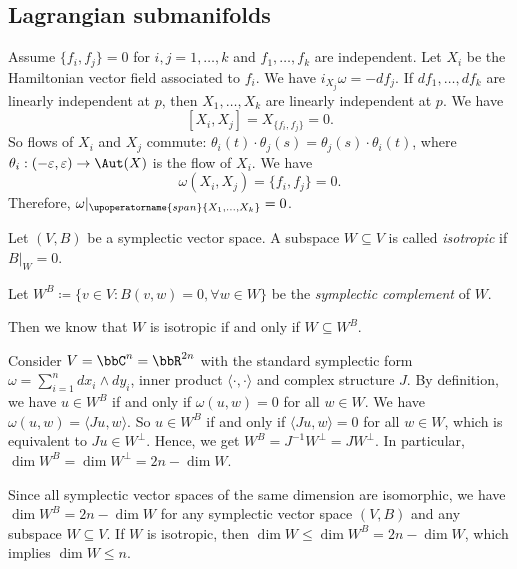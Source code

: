 \subsection{Lagrangian submanifolds}


  Assume $\{f_i,f_j\} = 0$ for $i,j = 1, \ldots, k$ and $f_1, \ldots, f_k$ are independent.
  Let $X_i$ be the Hamiltonian vector field associated to $f_i$.
  We have $i_{X_j} \omega = -d f_j$.
  If $df_1, \ldots, df_k$ are linearly independent at $p$, then $X_1, \ldots, X_k$ are linearly independent at $p$.
  We have 
  \[ [X_i, X_j] = X_{\{f_i, f_j\}} = 0. \]
  So flows of $X_i$ and $X_j$ commute: $\theta_i(t) \cdot \theta_j(s) = \theta_j(s) \cdot \theta_i(t)$, where $\theta_i: (-\varepsilon, \varepsilon) \to \Aut(X)$ is the flow of $X_i$.
  We have 
  \[ \omega(X_i, X_j) = \{f_i, f_j\} = 0. \]
  Therefore, $\omega|_{\upoperatorname{span}\{X_1, \ldots, X_k\}} = 0$.

  \begin{definition}
    Let $(V,B)$ be a symplectic vector space.
    A subspace $W \subseteq V$ is called \emph{isotropic} if $B|_{W} = 0$.
  \end{definition}

  \begin{definition}
    Let $W^B \coloneqq \{v \in V: B(v,w) = 0, \forall w \in W\}$ be the \emph{symplectic complement} of $W$.
  \end{definition}

  Then we know that $W$ is isotropic if and only if $W \subseteq W^B$.

  \begin{example}
    Consider $V = \bbC^n = \bbR^{2n}$ with the standard symplectic form $\omega = \sum_{i=1}^n dx_i \wedge dy_i$, inner product $\langle \cdot, \cdot \rangle$ and complex structure $J$.
    By definition, we have $u \in W^B$ if and only if $\omega(u, w) = 0$ for all $w \in W$.
    We have $\omega(u, w) = \langle J u, w \rangle$.
    So $u \in W^B$ if and only if $\langle J u, w \rangle = 0$ for all $w \in W$, which is equivalent to $J u \in W^\perp$.
    Hence, we get $W^B = J^{-1} W^\perp = J W^\perp$.
    In particular, $\dim W^B = \dim W^\perp = 2n - \dim W$.
  \end{example}

  Since all symplectic vector spaces of the same dimension are isomorphic, we have $\dim W^B = 2n - \dim W$ for any symplectic vector space $(V, B)$ and any subspace $W \subseteq V$.
  If $W$ is isotropic, then $\dim W \leq \dim W^B = 2n - \dim W$, which implies $\dim W \leq n$.

